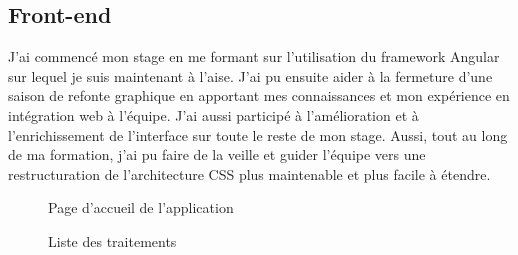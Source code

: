 \documentclass[12pt, a4paper]{report}
\newcommand\tab[1][1cm]{\hspace*{#1}}
\begin{document}
        \subsection{Front-end}
            \tab{} J'ai commencé mon stage en me formant sur l'utilisation du framework Angular sur lequel je suis maintenant à l'aise.\newline\newline
            J'ai pu ensuite aider à la fermeture d'une saison de refonte graphique en apportant mes connaissances et mon expérience en intégration web à l'équipe.\newline\newline
            J'ai aussi participé à l'amélioration et à l'enrichissement de l'interface sur toute le reste de mon stage.\newline\newline
            Aussi, tout au long de ma formation, j'ai pu faire de la veille et guider l'équipe vers une restructuration de l'architecture CSS plus maintenable et plus facile à étendre.\newline\newline
            \begin{figure}[H]
                \begin{center}
                \end{center}
                \caption{Page d'accueil de l'application}
            \end{figure}
            \begin{figure}[H]
                \begin{center}
                \end{center}
                \caption{Liste des traitements}
            \end{figure}
\end{document}
